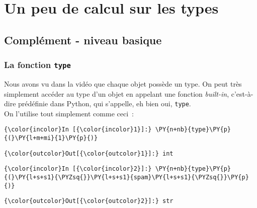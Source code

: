     \hypertarget{un-peu-de-calcul-sur-les-types}{%
\section{Un peu de calcul sur les
types}\label{un-peu-de-calcul-sur-les-types}}

    \hypertarget{compluxe9ment---niveau-basique}{%
\subsection{Complément - niveau
basique}\label{compluxe9ment---niveau-basique}}

    \hypertarget{la-fonction-type}{%
\subsubsection{\texorpdfstring{La fonction
\texttt{type}}{La fonction type}}\label{la-fonction-type}}

    Nous avons vu dans la vidéo que chaque objet possède un type. On peut
très simplement accéder au type d'un objet en appelant une fonction
\emph{built-in}, c'est-à-dire prédéfinie dans Python, qui s'appelle, eh
bien oui, \texttt{type}.\\

    On l'utilise tout simplement comme ceci~:

    \begin{Verbatim}[commandchars=\\\{\}]
{\color{incolor}In [{\color{incolor}1}]:} \PY{n+nb}{type}\PY{p}{(}\PY{l+m+mi}{1}\PY{p}{)}
\end{Verbatim}


\begin{Verbatim}[commandchars=\\\{\}]
{\color{outcolor}Out[{\color{outcolor}1}]:} int
\end{Verbatim}
            
    \begin{Verbatim}[commandchars=\\\{\}]
{\color{incolor}In [{\color{incolor}2}]:} \PY{n+nb}{type}\PY{p}{(}\PY{l+s+s1}{\PYZsq{}}\PY{l+s+s1}{spam}\PY{l+s+s1}{\PYZsq{}}\PY{p}{)}
\end{Verbatim}


\begin{Verbatim}[commandchars=\\\{\}]
{\color{outcolor}Out[{\color{outcolor}2}]:} str
\end{Verbatim}
            
